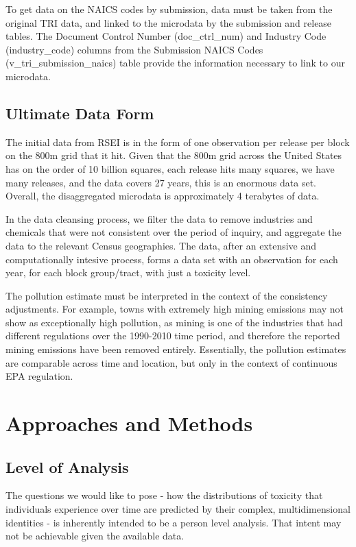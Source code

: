 \documentclass[12pt,twoside]{dukestatscithesis}
\theoremstyle{definition}
\theoremstyle{definition}
\theoremstyle{definition}
\theoremstyle{remark}
\begin{document}
To get data on the NAICS codes by submission, data must be taken from
the original TRI data, and linked to the microdata by the submission and
release tables. The Document Control Number (doc\_ctrl\_num) and
Industry Code (industry\_code) columns from the Submission NAICS Codes
(v\_tri\_submission\_naics) table provide the information necessary to
link to our microdata.

\section{Ultimate Data Form}\label{ultimate-data-form}

The initial data from RSEI is in the form of one observation per release
per block on the 800m grid that it hit. Given that the 800m grid across
the United States has on the order of 10 billion squares, each release
hits many squares, we have many releases, and the data covers 27 years,
this is an enormous data set. Overall, the disaggregated microdata is
approximately 4 terabytes of data.

In the data cleansing process, we filter the data to remove industries
and chemicals that were not consistent over the period of inquiry, and
aggregate the data to the relevant Census geographies. The data, after
an extensive and computationally intesive process, forms a data set with
an observation for each year, for each block group/tract, with just a
toxicity level.

The pollution estimate must be interpreted in the context of the
consistency adjustments. For example, towns with extremely high mining
emissions may not show as exceptionally high pollution, as mining is one
of the industries that had different regulations over the 1990-2010 time
period, and therefore the reported mining emissions have been removed
entirely. Essentially, the pollution estimates are comparable across
time and location, but only in the context of continuous EPA regulation.

\chapter{Approaches and Methods}\label{ref-labels}

\section{Level of Analysis}\label{level-of-analysis}

The questions we would like to pose - how the distributions of toxicity
that individuals experience over time are predicted by their complex,
multidimensional identities - is inherently intended to be a person
level analysis. That intent may not be achievable given the available
data.
\end{document}
